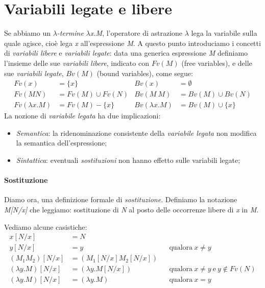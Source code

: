\documentclass[12pt, a4paper]{report}
\theoremstyle{definition}
\begin{document}
\section{Variabili legate e libere}
Se abbiamo un \emph{$\lambda$-termine} \emph{$\lambda$x.M}, l'operatore di astrazione
$\lambda$ lega la variabile sulla quale agisce, cioè lega \emph{x} all'espressione
\emph{M}. A questo punto introduciamo i concetti di \emph{variabili libere} e
\emph{variabili legate}: data una generica espressione \emph{M} definiamo l'insieme
delle sue \emph{variabili libere}, indicato con $Fv(M)$ (free variables), e delle
sue \emph{variabili legate}, $Bv(M)$ (bound variables), come segue:
\[\begin{aligned}
    Fv(x) & = \{x\} & Bv(x) & = \emptyset\\
    Fv(MN) & = Fv(M) \cup Fv(N) & Bv(M\ M) & = Bv(M) \cup Bv(N)\\
    Fv(\lambda x.M) & = Fv(M)-\{x\} & Bv(\lambda x.M) & = Bv(M) \cup \{x\}
\end{aligned}\]
La nozione di \emph{variabile legata} ha due implicazioni:
\begin{itemize}
    \item \emph{Semantica}: la ridenominazione consistente della \emph{variabile
    legata} non modifica la semantica dell'espressione;
    \item \emph{Sintattica}: eventuali \emph{sostituzioni} non hanno effetto
    sulle variabili legate;
\end{itemize}

\paragraph{Sostituzione}
Diamo ora, una definizione formale di \emph{sostituzione}. Definiamo la notazione
\emph{M[N/x]} che leggiamo: sostituzione di \emph{N} al posto delle occorrenze
libere di \emph{x} in \emph{M}.

Vediamo alcune casistiche:
\[\begin{aligned}
    x[N/x] & = N\\
    y[N/x] & = y && \text{qualora}\ x\neq y\\
    (M_1M_2)[N/x] & = (M_1[N/x]M_2[N/x])\\
    (\lambda y.M)[N/x] & = (\lambda y.M[N/x]) && \text{qualora}\ x\neq y\ \text{e}
    \ y\notin Fv(N)\\
    (\lambda y.M)[N/x] & = (\lambda y.M) && \text{qualora}\ x=y
\end{aligned}\]
\end{document}
